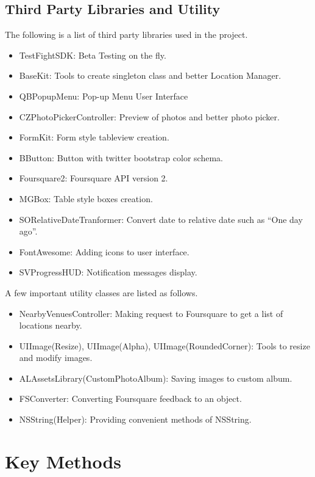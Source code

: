 \subsection{Third Party Libraries and Utility} %
\label{sub:third_party_and_utilities}
The following is a list of third party libraries used in the project.
		\begin{itemize}
		    \item TestFightSDK: Beta Testing on the fly.
		    \item BaseKit: Tools to create singleton class and better Location Manager.
			\item QBPopupMenu: Pop-up Menu User Interface
			\item CZPhotoPickerController: Preview of photos and better photo picker.
			\item FormKit: Form style tableview creation.
			\item BButton: Button with twitter bootstrap color schema.
			\item Foursquare2: Foursquare API version 2.
			\item MGBox: Table style boxes creation.
			\item SORelativeDateTranformer: Convert date to relative date such as ``One day ago''.
			\item FontAwesome: Adding icons to user interface.
			\item SVProgressHUD: Notification messages display.
		 \end{itemize}
A few important utility classes are listed as follows. 
		\begin{itemize}
		    \item NearbyVenuesController: Making request to Foursquare to get a list of locations nearby.
		    \item UIImage(Resize), UIImage(Alpha), UIImage(RoundedCorner): Tools to resize and modify images.
			\item ALAssetsLibrary(CustomPhotoAlbum): Saving images to custom album.
			\item FSConverter: Converting Foursquare feedback to an object.
			\item NSString(Helper): Providing convenient methods of NSString. 
		 \end{itemize}


\section{Key Methods} %
\label{sec:main_methods}

